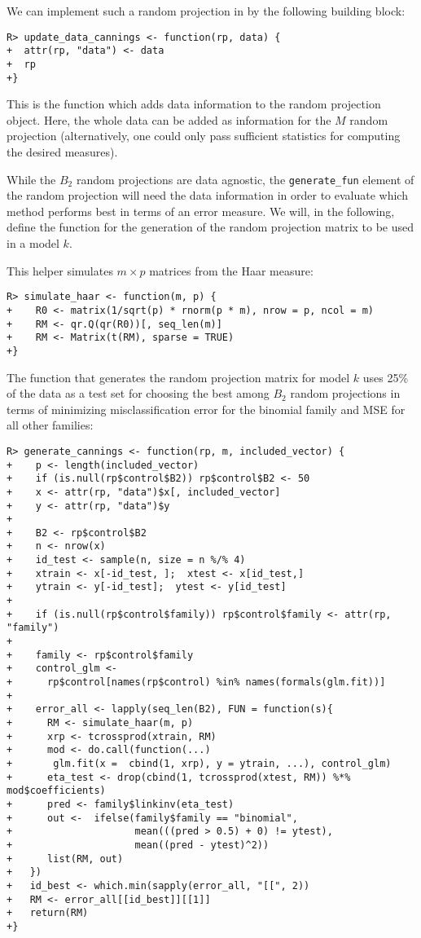 \documentclass[
  article]{jss}
\begin{document}
We can implement such a random projection in  by the following
building block:

\begin{verbatim}
R> update_data_cannings <- function(rp, data) {
+  attr(rp, "data") <- data
+  rp
+}
\end{verbatim}

This is the function which adds data information to the random
projection object. Here, the whole data can be added as information for
the \(M\) random projection (alternatively, one could only pass
sufficient statistics for computing the desired measures).

While the \(B_2\) random projections are data agnostic, the
\texttt{generate\_fun} element of the random projection will need the
data information in order to evaluate which method performs best in
terms of an error measure. We will, in the following, define the
function for the generation of the random projection matrix to be used
in a model \(k\).

This helper simulates \(m\times p\) matrices from the Haar measure:

\begin{verbatim}
R> simulate_haar <- function(m, p) {
+    R0 <- matrix(1/sqrt(p) * rnorm(p * m), nrow = p, ncol = m)
+    RM <- qr.Q(qr(R0))[, seq_len(m)]
+    RM <- Matrix(t(RM), sparse = TRUE)  
+}
\end{verbatim}

The function that generates the random projection matrix for model \(k\)
uses 25\% of the data as a test set for choosing the best among \(B_2\)
random projections in terms of minimizing misclassification error for
the binomial family and MSE for all other families:

\begin{verbatim}
R> generate_cannings <- function(rp, m, included_vector) {
+    p <- length(included_vector)
+    if (is.null(rp$control$B2)) rp$control$B2 <- 50
+    x <- attr(rp, "data")$x[, included_vector]
+    y <- attr(rp, "data")$y
+  
+    B2 <- rp$control$B2
+    n <- nrow(x)
+    id_test <- sample(n, size = n %/% 4)
+    xtrain <- x[-id_test, ];  xtest <- x[id_test,]
+    ytrain <- y[-id_test];  ytest <- y[id_test]
+  
+    if (is.null(rp$control$family)) rp$control$family <- attr(rp, "family")
+  
+    family <- rp$control$family
+    control_glm <-
+      rp$control[names(rp$control) %in% names(formals(glm.fit))]
+
+    error_all <- lapply(seq_len(B2), FUN = function(s){
+      RM <- simulate_haar(m, p)
+      xrp <- tcrossprod(xtrain, RM)
+      mod <- do.call(function(...) 
+       glm.fit(x =  cbind(1, xrp), y = ytrain, ...), control_glm)
+      eta_test <- drop(cbind(1, tcrossprod(xtest, RM)) %*% mod$coefficients)
+      pred <- family$linkinv(eta_test)
+      out <-  ifelse(family$family == "binomial",
+                     mean(((pred > 0.5) + 0) != ytest), 
+                     mean((pred - ytest)^2))
+      list(RM, out)
+   })
+   id_best <- which.min(sapply(error_all, "[[", 2))
+   RM <- error_all[[id_best]][[1]]
+   return(RM)
+}
\end{verbatim}
\end{document}
